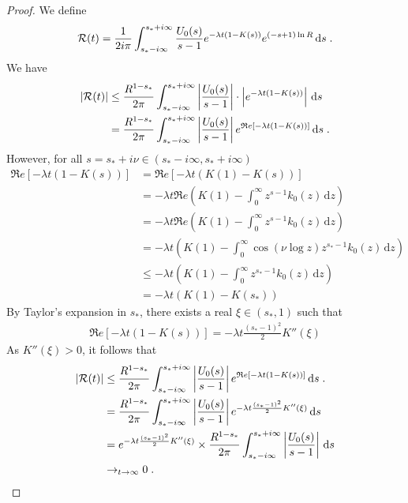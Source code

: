 \documentclass[11pt]{amsart}
\renewcommand{\Re}{\mathfrak{R}e}
\newcommand{\diff}{\,\mathrm{d}}
\begin{document}
\begin{proof}
We define
\begin{align*}
    \Rcal(t) = \frac{1}{2i\pi} \int_{s_*-i\infty}^{s_*+i\infty} \frac{U_0(s)}{s-1} e^{-\lambda t(1 - K(s))} e^{(-s+1)\ln R} \diff s
    \eqfinp
\end{align*}
We have 
\begin{align*}
    |\Rcal(t)| 
    &\leq \frac{R^{1-s_*}}{2\pi} \int_{s_*-i\infty}^{s_*+i\infty} \left|\frac{U_0(s) }{s-1}\right| \cdot \left|e^{-\lambda t(1 - K(s))}\right| \diff s \\
    &= \frac{R^{1-s_*}}{2\pi} \int_{s_*-i\infty}^{s_*+i\infty} \left|\frac{U_0(s) }{s-1}\right| e^{\Re[-\lambda t(1 - K(s))]} \diff s
    \eqfinp
\end{align*}
However, for all $s = s_* + i\nu \in (s_*-i \infty, s_* + i \infty)$
\begin{align*}
    \Re[-\lambda t(1 - K(s))] 
    &= \Re[-\lambda t(K(1) - K(s))] \\
    &= -\lambda t \Re\left( K(1) - \int_0^\infty z^{s-1}k_0(z)\diff z  \right) \\
    &= -\lambda t \Re\left( K(1) - \int_0^\infty z^{s-1}k_0(z)\diff z  \right) \\
    &=  -\lambda t\left( K(1) - \int_0^\infty \cos(\nu \log z) z^{s_*-1}k_0(z)\diff z  \right) \\
    &\leq -\lambda t \left( K(1) - \int_0^\infty z^{s_*-1}k_0(z)\diff z  \right) \\
    &= -\lambda t \left( K(1) - K(s_*)  \right)
\end{align*}
By Taylor's expansion in $s_*$, there exists a real $\xi \in (s_*, 1)$ such that 
\begin{align*}
    \Re[-\lambda t(1 - K(s))] = - \lambda t \frac{(s_*-1)^2}{2}  K''(\xi) 
\end{align*}
As $ K''(\xi) > 0$, it follows that 
\begin{align*}
    |\Rcal(t)| 
    &\leq \frac{R^{1-s_*}}{2\pi} \int_{s_*-i\infty}^{s_*+i\infty} \left|\frac{U_0(s) }{s-1}\right| e^{\Re[-\lambda t(1 - K(s))]} \diff s
    \eqfinp \\
    &= \frac{R^{1-s_*}}{2\pi} \int_{s_*-i\infty}^{s_*+i\infty} \left|\frac{U_0(s) }{s-1}\right| e^{- \lambda t \frac{(s_*-1)^2}{2}  K''(\xi) } \diff s \\
    &= e^{- \lambda t \frac{(s_*-1)^2}{2}  K''(\xi)} \times \frac{R^{1-s_*}}{2\pi} \int_{s_*-i\infty}^{s_*+i\infty} \left|\frac{U_0(s) }{s-1}\right| \diff s \\
    &\to_{t \to \infty} 0
    \eqfinp
\end{align*}


\end{proof}
\end{document}
